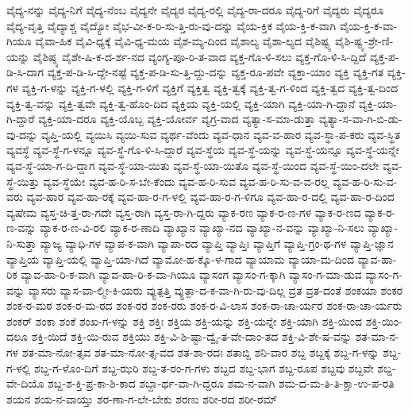 {ವೈದ್ಯ-ನನ್ನು
ವೈದ್ಯ-ನಿಗೆ
ವೈದ್ಯ-ನೆಂಬ
ವೈದ್ಯನೇ
ವೈದ್ಯರ
ವೈದ್ಯ-ರಲ್ಲಿ
ವೈದ್ಯ-ರಾ-ದರೂ
ವೈದ್ಯ-ರಿಗೆ
ವೈದ್ಯರು
ವೈದ್ಯರೂ
ವೈದ್ಯ-ವೃತ್ತಿ
ವೈದ್ಯಾಶ್ಚ
ವೈದ್ಯೋ
ವೈಭ-ವೀ-ಕ-ರಿ-ಸು-ತ್ತಿ-ರು-ವು-ದನ್ನು
ವೈಯ-ಕ್ತಿಕ
ವೈಯ-ಕ್ತಿ-ಕ-ವಾಗಿ
ವೈಯ-ಕ್ತಿ-ಕ-ವಾ-ಗಿಯೂ
ವೈವಾ-ಹಿಕ
ವೈವಿ-ಧ್ಯಕ್ಕೆ
ವೈವಿ-ಧ್ಯ-ಮಯ
ವೈಶ-ಮ್ಯ-ದಿಂದ
ವೈಶಾಲ್ಯ
ವೈಶಾ-ಲ್ಯದ
ವೈಶಿಷ್ಟ್ಯ
ವೈಶಿ-ಷ್ಟ್ಯ-ಶ್ರೇ-ಣಿ-ಯನ್ನು
ವೈಶಿಷ್ಠ್ಯ
ವೈಶೇ-ಷಿ-ಕ-ದ-ರ್ಶ-ನದ
ವ್ಯಂಗ್ಯ-ಪೂ-ರಿ-ತ-ವಾದ
ವ್ಯಕ್ತ-ಗೊ-ಳಿ-ಸಲು
ವ್ಯಕ್ತ-ಗೊ-ಳಿ-ಸಿ-ದ್ದಿದೆ
ವ್ಯಕ್ತ-ಪ-ಡಿ-ಸಿ-ದಾಗ
ವ್ಯಕ್ತ-ಪ-ಡಿ-ಸಿ-ದ್ದೇ-ನಷ್ಟೆ
ವ್ಯಕ್ತ-ಪ-ಡಿ-ಸು-ತ್ತಿ-ದ್ದು-ದನ್ನು
ವ್ಯಕ್ತ-ರೂ-ಪವೇ
ವ್ಯಕ್ತಾ-ಯಾಂ
ವ್ಯಕ್ತಿ
ವ್ಯಕ್ತಿ-ಗತ
ವ್ಯಕ್ತಿ-ಗಳ
ವ್ಯಕ್ತಿ-ಗ-ಳನ್ನು
ವ್ಯಕ್ತಿ-ಗ-ಳಲ್ಲಿ
ವ್ಯಕ್ತಿ-ಗ-ಳಿಗೆ
ವ್ಯಕ್ತಿಗೆ
ವ್ಯಕ್ತಿತ್ವ
ವ್ಯಕ್ತಿ-ತ್ವಕ್ಕೆ
ವ್ಯಕ್ತಿ-ತ್ವ-ಗ-ಳಿಂದ
ವ್ಯಕ್ತಿ-ತ್ವದ
ವ್ಯಕ್ತಿ-ತ್ವ-ದಿಂದ
ವ್ಯಕ್ತಿ-ತ್ವ-ವನ್ನು
ವ್ಯಕ್ತಿ-ತ್ವವೇ
ವ್ಯಕ್ತಿ-ತ್ವ-ಹೊಂ-ದಿದ
ವ್ಯಕ್ತಿಯ
ವ್ಯಕ್ತಿ-ಯಲ್ಲಿ
ವ್ಯಕ್ತಿ-ಯಾಗಿ
ವ್ಯಕ್ತಿ-ಯಾ-ಗಿ-ದ್ದಾನೆ
ವ್ಯಕ್ತಿ-ಯಾ-ಗಿ-ದ್ದಾರೆ
ವ್ಯಕ್ತಿ-ಯಾ-ದರೂ
ವ್ಯಕ್ತಿ-ಯೊಬ್ಬ
ವ್ಯಕ್ತಿ-ಯೋರ್ವ
ವ್ಯಗ್ರ-ವಾದ
ವ್ಯತ್ಯಾ-ಸ-ಮಾ-ಡುತ್ತಾ
ವ್ಯತ್ಯಾ-ಸ-ವಾ-ಗಿ-ಬಿ-ಡು-ವು-ದನ್ನು
ವ್ಯಪ್ತಿ-ಯಲ್ಲಿ
ವ್ಯಯಿಸಿ
ವ್ಯಯಿ-ಸುವ
ವ್ಯರ್ಥ-ವೆಂದು
ವ್ಯವ-ಧಾನ
ವ್ಯವ-ವ-ಹಾರ
ವ್ಯವ-ಸ್ಥಾ-ಪ-ಕರು
ವ್ಯವ-ಸ್ಥಿತ
ವ್ಯವಸ್ಥೆ
ವ್ಯವ-ಸ್ಥೆ-ಗ-ಳನ್ನೂ
ವ್ಯವ-ಸ್ಥೆ-ಗೊ-ಳಿ-ಸಿ-ದ್ದಾರೆ
ವ್ಯವ-ಸ್ಥೆಯ
ವ್ಯವ-ಸ್ಥೆ-ಯನ್ನು
ವ್ಯವ-ಸ್ಥೆ-ಯನ್ನೂ
ವ್ಯವ-ಸ್ಥೆ-ಯನ್ನೇ
ವ್ಯವ-ಸ್ಥೆ-ಯಾ-ಗ-ದಿ-ದ್ದಾಗ
ವ್ಯವ-ಸ್ಥೆ-ಯಾ-ಯಿತು
ವ್ಯವ-ಸ್ಥೆ-ಯಾ-ಯಿತೊ
ವ್ಯವ-ಸ್ಥೆ-ಯಿಂದ
ವ್ಯವ-ಸ್ಥೆ-ಯಿಂ-ದಲೇ
ವ್ಯವ-ಸ್ಥೆ-ಯಿತ್ತು
ವ್ಯವ-ಸ್ಥೆಯೇ
ವ್ಯವ-ಹ-ರಿ-ಸ-ಬೇ-ಕೆಂದು
ವ್ಯವ-ಹ-ರಿ-ಸುವ
ವ್ಯವ-ಹ-ರಿ-ಸು-ವ-ವ-ರಲ್ಲ
ವ್ಯವ-ಹ-ರಿ-ಸು-ವ-ವರು
ವ್ಯವ-ಹಾರ
ವ್ಯವ-ಹಾ-ರಕ್ಕೆ
ವ್ಯವ-ಹಾ-ರ-ಗ-ಳಲ್ಲಿ
ವ್ಯವ-ಹಾ-ರ-ಗ-ಳಿಗೂ
ವ್ಯವ-ಹಾ-ರ-ದಲ್ಲಿ
ವ್ಯವ-ಹಾ-ರ-ದಿಂದ
ವ್ಯಷೇಮ
ವ್ಯಸ್ತ-ಚಿ-ತ್ತ-ರಾ-ಗದೇ
ವ್ಯಸ್ತ-ರಾಗಿ
ವ್ಯಸ್ತ-ರಾ-ಗಿ-ದ್ದರು
ವ್ಯಾಕ-ರಣ
ವ್ಯಾಕ-ರ-ಣ-ಗಳ
ವ್ಯಾಕ-ರ-ಣದ
ವ್ಯಾಕ-ರ-ಣ-ವನ್ನು
ವ್ಯಾಕ-ರ-ಣ-ವಿ-ರಲಿ
ವ್ಯಾಕ-ರ-ಣಾದಿ
ವ್ಯಾಖ್ಯಾನ
ವ್ಯಾಖ್ಯಾ-ನದ
ವ್ಯಾಖ್ಯಾ-ನ-ವನ್ನು
ವ್ಯಾಖ್ಯಾ-ನಿ-ಸಲು
ವ್ಯಾಖ್ಯಾ-ನಿ-ಸುತ್ತಾ
ವ್ಯಾಜ್ಯ
ವ್ಯಾಧಿ-ಗಳ
ವ್ಯಾಪ-ಕ-ವಾಗಿ
ವ್ಯಾಪಾ-ರದ
ವ್ಯಾಪ್ತಿ
ವ್ಯಾಪ್ತಿಃ
ವ್ಯಾಪ್ತಿಗೆ
ವ್ಯಾಪ್ತಿ-ಗ್ರಂ-ಥ-ಗಳ
ವ್ಯಾಪ್ತಿ-ಜ್ಞಾನ
ವ್ಯಾಪ್ತಿಯ
ವ್ಯಾಪ್ತಿ-ಯಲ್ಲಿ
ವ್ಯಾಪ್ತಿ-ಯಾ-ಗಿದೆ
ವ್ಯಾಮೋ-ಹ-ಕ್ಕೊ-ಳ-ಗಾದ
ವ್ಯಾಯಾಮ
ವ್ಯಾಯಾ-ಮ-ದಿಂದ
ವ್ಯಾವ-ಹಾ-ರಿಕ
ವ್ಯಾವ-ಹಾ-ರಿ-ಕ-ವಾಗಿ
ವ್ಯಾವ-ಹಾ-ರಿ-ಕ-ವಾ-ಗಿಯೂ
ವ್ಯಾಸಂಗ
ವ್ಯಾಸಂ-ಗ-ಕ್ಕಾಗಿ
ವ್ಯಾಸಂ-ಗ-ಮಾ-ಡುವ
ವ್ಯಾಸಂ-ಗ-ವನ್ನು
ವ್ಯಾಸರು
ವ್ಯಾಸ-ವಾ-ಲ್ಮೀ-ಕಿ-ಯರು
ವ್ಯುತ್ಪತ್ತಿ
ವ್ಯುತ್ಪಾ-ದ-ಕ-ವಾ-ಗಿ-ರು-ವು-ದಿಲ್ಲ
ವ್ರತ
ವ್ರತ-ದಂತೆ
ಶಂಕಯಾ
ಶಂಕರ
ಶಂಕ-ರ-ಮಠ
ಶಂಕ-ರ-ಮ-ಠದ
ಶಂಕ-ರರ
ಶಂಕ-ರರು
ಶಂಕ-ರ-ವಿ-ಲಾಸ
ಶಂಕ-ರಾ-ಚಾ-ರ್ಯರ
ಶಂಕ-ರಾ-ಚಾ-ರ್ಯರು
ಶಂಕರ್
ಶಂಕಾ
ಶಂಕೆ
ಶಂಖ-ಗ-ಳನ್ನು
ಶಕ್ತಿ
ಶಕ್ತಿಃ
ಶಕ್ತಿಯ
ಶಕ್ತಿ-ಯನ್ನು
ಶಕ್ತಿ-ಯನ್ನೇ
ಶಕ್ತಿ-ಯಾಗಿ
ಶಕ್ತಿ-ಯಿಂದ
ಶಕ್ತಿ-ಯಿಂ-ದಲೂ
ಶಕ್ತಿ-ಯಿದೆ
ಶಕ್ತಿ-ಯಿ-ರುವ
ಶಕ್ತಿಯು
ಶಕ್ತಿ-ವಿ-ಶಿ-ಷ್ಟಾ-ದ್ವೈ-ತ-ವೇ-ದಾಂ-ತದ
ಶಕ್ತಿ-ವಿ-ಶೇ-ಷ-ವನ್ನು
ಶತ-ಮಾ-ನ-ಗಳ
ಶತ-ಮಾ-ನೋ-ತ್ಸವ
ಶತ-ಮಾ-ನೋ-ತ್ಸ-ವದ
ಶತ-ಶಾ-ರದಃ
ಶತಾಬ್ದಿ
ಶನಿ-ವಾರ
ಶಬ್ದ
ಶಬ್ದಕ್ಕೆ
ಶಬ್ದ-ಗ-ಳನ್ನು
ಶಬ್ದ-ಗ-ಳಲ್ಲಿ
ಶಬ್ದ-ಗ-ಳೊಂ-ದಿಗೆ
ಶಬ್ದ-ಝರಿ
ಶಬ್ದ-ತ-ರಂ-ಗ-ಗಳು
ಶಬ್ದದ
ಶಬ್ದ-ಭಾಗ
ಶಬ್ದ-ರೂಪ
ಶಬ್ದವು
ಶಬ್ದವೇ
ಶಬ್ದ-ವೇ-ದಿಯೊ
ಶಬ್ದ-ಶ-ಕ್ತಿ-ಪ್ರ-ಕಾ-ಶಿ-ಕಾದ
ಶಬ್ದಾ-ರ್ಥ-ವಾ-ಗಿ-ದ್ದರೂ
ಶಮ-ನ-ವಾಗಿ
ಶಮ-ದ-ಮ-ತಿ-ತಿ-ಕ್ಷಾ-ಉ-ಪ-ರತಿ
ಶಯನ
ಶಯ-ನ-ವಾಯ್ತು
ಶರ-ಣಾ-ಗ-ಲೇ-ಬೇಕು
ಶರಣು
ಶರೀ-ರದ
ಶರೀ-ರಮ್
}
